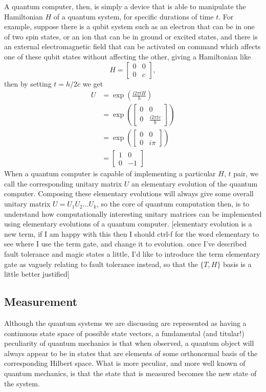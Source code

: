 A quantum computer, then, is simply a device that is able to manipulate the Hamiltonian $H$ of a quantum system, for specific durations of time $t$. For example, suppose there is a qubit system such as an electron that can be in one of two spin states, or an ion that can be in ground or excited states, and there is an external electromagnetic field that can be activated on command which affects one of these qubit states without affecting the other, giving a Hamiltonian like
\[H = \begin{bmatrix}
0 & 0 \\ 0 & c
\end{bmatrix},\]
then by setting $t = h/2c$ we get
\begin{align*}
U &= \exp\left(\frac{i 2\pi tH}{h}\right)
\\&= \exp\left(\begin{bmatrix}
0 & 0 \\
0 & \frac{i 2\pi tc}{h}
\end{bmatrix}\right)
\\&= \exp\left(\begin{bmatrix}
0 & 0 \\
0 & i\pi
\end{bmatrix}\right)
\\&= \begin{bmatrix}
1 & 0 \\
0 & -1
\end{bmatrix}
\end{align*}
When a quantum computer is capable of implementing a particular $H$, $t$ pair, we call the corresponding unitary matrix $U$ an elementary evolution of the quantum computer. Composing these elementary evolutions will always give some overall unitary matrix $U = U_1U_2\dots U_k$, so the core of quantum computation then, is to understand how computationally interesting unitary matrices can be implemented using elementary evolutions of a quantum computer. [elementary evolution is a new term, if I am happy with this then I should ctrl-f for the word elementary to see where I use the term gate, and change it to evolution. once I've described fault tolerance and magic states a little, I'd like to introduce the term elementary gate as vaguely relating to fault tolerance instead, so that the $\{T, H\}$ basis is a little better justified]
\subsection{Measurement}
Although the quantum systems we are discussing are represented as having a continuous state space of possible state vectors, a fundamental (and titular!) peculiarity of quantum mechanics is that when observed, a quantum object will always appear to be in states that are elements of some orthonormal basis of the corresponding Hilbert space. What is more peculiar, and more well known of quantum mechanics, is that the state that is measured becomes the new state of the system.

